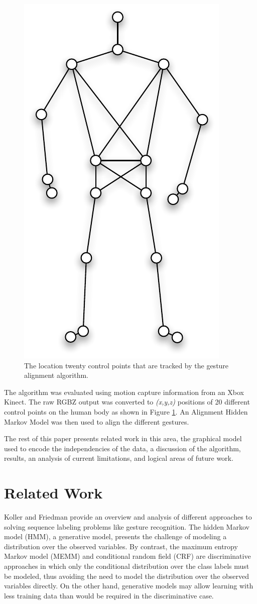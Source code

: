 \documentclass{article}
\begin{document}
\begin{figure}
\begin{centering}
\includegraphics[width=0.4\columnwidth]{figures/control_points.pdf}

\caption{The location twenty control points that are tracked by the gesture
alignment algorithm.\label{figure:control_points}}

\end{centering}
\end{figure}

The algorithm was evaluated using motion capture information from an Xbox
Kinect. The raw RGBZ output was converted to \emph{(x,y,z)} positions of 20
different control points on the human body as shown in Figure
\ref{figure:control_points}. An Alignment Hidden Markov Model was then used to
align the different gestures.

The rest of this paper presents related work in this area, the graphical model
used to encode the independencies of the data, a discussion of the algorithm,
results, an analysis of current limitations, and logical areas of future work.


\section{Related Work}

Koller and Friedman \cite{Koller2009} provide an overview and analysis of
different approaches to solving sequence labeling problems like gesture
recognition. The hidden Markov model (HMM), a generative model, presents
the challenge of modeling a distribution over the observed variables. By
contrast, the maximum entropy Markov model (MEMM) and conditional random
field (CRF) are discriminative approaches in which only the conditional
distribution over the class labels must be modeled, thus avoiding the need to
model the distribution over the observed variables directly. On the other hand,
generative models may allow learning with less training data than would be
required in the discriminative case.
\end{document}
